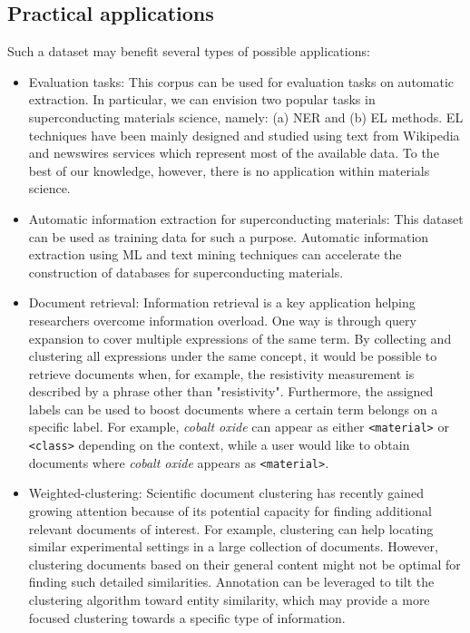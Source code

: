 \documentclass[]{interact}
\theoremstyle{plain}%
\theoremstyle{definition}
\theoremstyle{remark}
\begin{document}
\subsection{Practical applications}
Such a dataset may benefit several types of possible applications: 

\begin{itemize}
    \item Evaluation tasks: This corpus can be used for evaluation tasks on automatic extraction. In particular, we can envision two popular tasks in superconducting materials science, namely: (a) NER and (b) EL methods. EL techniques have been mainly designed and studied using text from Wikipedia and newswires services which represent most of the available data. 
    To the best of our knowledge, however, there is no application within materials science.
    \item Automatic information extraction for superconducting materials: This dataset can be used as training data for such a purpose. 
    Automatic information extraction using ML and text mining techniques can accelerate the construction of databases for superconducting materials.
    \item Document retrieval: Information retrieval is a key application helping researchers overcome information overload.
    One way is through query expansion to cover multiple expressions of the same term. 
    By collecting and clustering all expressions under the same concept, it would be possible to retrieve documents when, for example, the resistivity measurement is described by a phrase other than "resistivity". 
    Furthermore, the assigned labels can be used to boost documents where a certain term belongs on a specific label. 
    For example, \textit{cobalt oxide} can appear as either \texttt{<material>} or \texttt{<class>} depending on the context, while a user would like to obtain documents where \textit{cobalt oxide} appears as \texttt{<material>}.
    \item Weighted-clustering: Scientific document clustering has recently gained growing attention because of its potential capacity for finding additional relevant documents of interest.
    For example, clustering can help locating similar experimental settings in a large collection of documents. However, clustering documents based on their general content might not be optimal for finding such detailed similarities.
    Annotation can be leveraged to tilt the clustering algorithm toward entity similarity, which may provide a more focused clustering towards a specific type of information.
\end{itemize}
\end{document}
